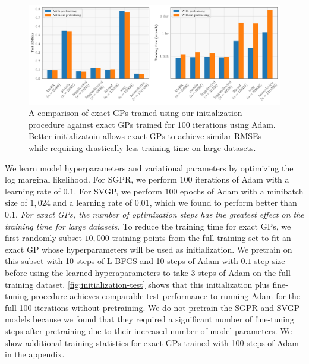 \begin{figure}[h!]
  \centering
  \includegraphics[width=\linewidth]{figures/initialization-rmse-timings.pdf}
  \caption{
	A comparison of exact GPs trained using our initialization procedure against exact GPs trained for 100 iterations using Adam.
	Better initializatoin allows exact GPs to achieve similar RMSEs while requiring drastically less training time on large datasets.
  }
  \label{fig:initialization-test}
\end{figure}
We learn model hyperparameters and variational parameters
by optimizing the log marginal likelihood.
For SGPR, we perform $100$ iterations of Adam with a learning rate of $0.1$.
For SVGP, we perform $100$ epochs of Adam with a minibatch size of $1,\!024$ and a learning rate of $0.01$, which
we found to perform better than $0.1$.
\textit{For exact GPs, the number of optimization steps has the greatest
effect on the training time for large datasets.} To reduce the training time for
exact GPs, we first randomly
subset $10,\!000$ training points from the full training set to fit an exact GP whose hyperparameters will be used as initialization. We pretrain on this subset with 10 steps
of L-BFGS \citep{liu1989lbfgs} and 10 steps of Adam \citep{kingma2014adam} with $0.1$ step size before using the learned hyperaparameters to take 3 steps of Adam on the full training dataset. \autoref{fig:initialization-test} shows
that this initialization plus fine-tuning procedure achieves comparable test
performance to running Adam for the full 100 iterations without pretraining.
We do not pretrain the SGPR and SVGP models because we found that they
required a significant number of fine-tuning steps after pretraining due to
their increased number of model parameters. We show additional training
statistics for exact GPs trained with 100 steps of Adam in the appendix.

